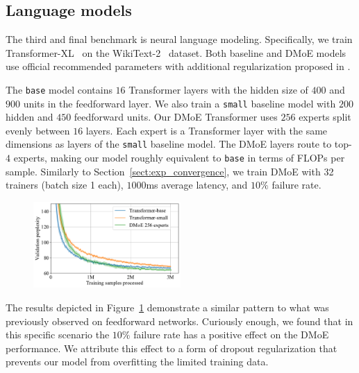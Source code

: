\subsection{Language models}\label{sect:exp_lm}

The third and final benchmark is neural language modeling. Specifically, we train Transformer-XL~\cite{dai2019transformer} on the WikiText-2~\cite{wikitext2} dataset. Both baseline and DMoE models use official recommended parameters with additional regularization proposed in \cite{dettmerswikitext2}.

The \texttt{base} model contains $16$ Transformer layers with the hidden size of $400$ and $900$ units in the feedforward layer. We also train a \texttt{small} baseline model with $200$ hidden and $450$ feedforward units. Our DMoE Transformer uses $256$ experts split evenly between $16$ layers. Each expert is a Transformer layer with the same dimensions as layers of the \texttt{small} baseline model. The DMoE layers route to top-$4$ experts, making our model roughly equivalent to \texttt{base} in terms of FLOPs per sample. Similarly to Section~\ref{sect:exp_convergence}, we train DMoE with 32 trainers (batch size 1 each), $1000$ms average latency, and $10\%$ failure rate.

\begin{figure}[h]
\vspace{-2px}
    \centering
        \includegraphics[width=0.5\textwidth]{resources/convergence_wikitext.pdf}
    \label{fig:convergence_lm}
\end{figure}

The results depicted in Figure~\ref{fig:convergence_lm} demonstrate a similar pattern to what was previously observed on feedforward networks. Curiously enough, we found that in this specific scenario the $10\%$ failure rate has a positive effect on the DMoE performance. We attribute this effect to a form of dropout regularization that prevents our model from overfitting the limited training data.
